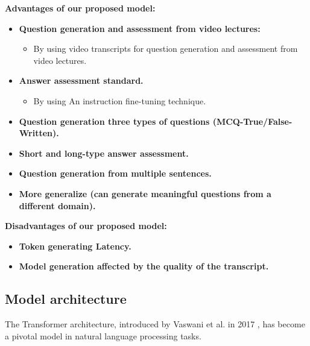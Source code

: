 \hfill \break
 \textbf{Advantages of our proposed model:}
\begin{itemize}
    \item \textbf{Question generation and assessment from video lectures:}
    \begin{itemize}
        \item By using video transcripts for question generation and assessment from video lectures.
    \end{itemize}

     \item \textbf{Answer assessment standard.}
    \begin{itemize}
        \item By using An instruction fine-tuning technique.
    \end{itemize}
        
    \item \textbf{Question generation three types of questions (MCQ-True/False-Written).}


    \item \textbf{Short and long-type answer assessment.}

    \item \textbf{Question generation from multiple sentences.}
    
    \item \textbf{More generalize (can generate meaningful questions from a different domain).}
    
  \end{itemize}    


\hfill \break
 \textbf{Disadvantages of our proposed model:}
\begin{itemize}

    \item \textbf{Token generating Latency.}

    \item \textbf{Model generation affected by the quality of the transcript.}

  \end{itemize}    


\newpage
\subsection{Model architecture} 

The Transformer architecture, introduced by Vaswani et al. in 2017 \cite{vaswani2017attention}, has become a pivotal model in natural language processing tasks.

